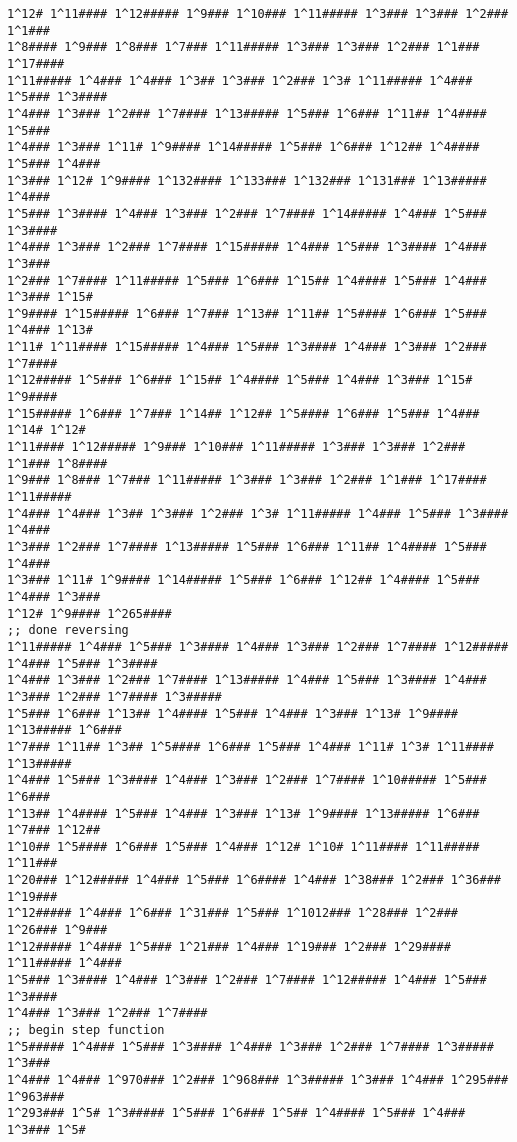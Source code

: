 \begin{@twocolumnfalse}
\begin{lstlisting}
1^12# 1^11#### 1^12##### 1^9### 1^10### 1^11##### 1^3### 1^3### 1^2### 1^1###
1^8#### 1^9### 1^8### 1^7### 1^11##### 1^3### 1^3### 1^2### 1^1### 1^17####
1^11##### 1^4### 1^4### 1^3## 1^3### 1^2### 1^3# 1^11##### 1^4### 1^5### 1^3####
1^4### 1^3### 1^2### 1^7#### 1^13##### 1^5### 1^6### 1^11## 1^4#### 1^5###
1^4### 1^3### 1^11# 1^9#### 1^14##### 1^5### 1^6### 1^12## 1^4#### 1^5### 1^4###
1^3### 1^12# 1^9#### 1^132#### 1^133### 1^132### 1^131### 1^13##### 1^4###
1^5### 1^3#### 1^4### 1^3### 1^2### 1^7#### 1^14##### 1^4### 1^5### 1^3####
1^4### 1^3### 1^2### 1^7#### 1^15##### 1^4### 1^5### 1^3#### 1^4### 1^3###
1^2### 1^7#### 1^11##### 1^5### 1^6### 1^15## 1^4#### 1^5### 1^4### 1^3### 1^15#
1^9#### 1^15##### 1^6### 1^7### 1^13## 1^11## 1^5#### 1^6### 1^5### 1^4### 1^13#
1^11# 1^11#### 1^15##### 1^4### 1^5### 1^3#### 1^4### 1^3### 1^2### 1^7####
1^12##### 1^5### 1^6### 1^15## 1^4#### 1^5### 1^4### 1^3### 1^15# 1^9####
1^15##### 1^6### 1^7### 1^14## 1^12## 1^5#### 1^6### 1^5### 1^4### 1^14# 1^12#
1^11#### 1^12##### 1^9### 1^10### 1^11##### 1^3### 1^3### 1^2### 1^1### 1^8####
1^9### 1^8### 1^7### 1^11##### 1^3### 1^3### 1^2### 1^1### 1^17#### 1^11#####
1^4### 1^4### 1^3## 1^3### 1^2### 1^3# 1^11##### 1^4### 1^5### 1^3#### 1^4###
1^3### 1^2### 1^7#### 1^13##### 1^5### 1^6### 1^11## 1^4#### 1^5### 1^4###
1^3### 1^11# 1^9#### 1^14##### 1^5### 1^6### 1^12## 1^4#### 1^5### 1^4### 1^3###
1^12# 1^9#### 1^265#### 
;; done reversing 
1^11##### 1^4### 1^5### 1^3#### 1^4### 1^3### 1^2### 1^7#### 1^12##### 1^4### 1^5### 1^3####
1^4### 1^3### 1^2### 1^7#### 1^13##### 1^4### 1^5### 1^3#### 1^4### 1^3### 1^2### 1^7#### 1^3#####
1^5### 1^6### 1^13## 1^4#### 1^5### 1^4### 1^3### 1^13# 1^9#### 1^13##### 1^6###
1^7### 1^11## 1^3## 1^5#### 1^6### 1^5### 1^4### 1^11# 1^3# 1^11#### 1^13#####
1^4### 1^5### 1^3#### 1^4### 1^3### 1^2### 1^7#### 1^10##### 1^5### 1^6###
1^13## 1^4#### 1^5### 1^4### 1^3### 1^13# 1^9#### 1^13##### 1^6### 1^7### 1^12##
1^10## 1^5#### 1^6### 1^5### 1^4### 1^12# 1^10# 1^11#### 1^11##### 1^11###
1^20### 1^12##### 1^4### 1^5### 1^6#### 1^4### 1^38### 1^2### 1^36### 1^19###
1^12##### 1^4### 1^6### 1^31### 1^5### 1^1012### 1^28### 1^2### 1^26### 1^9###
1^12##### 1^4### 1^5### 1^21### 1^4### 1^19### 1^2### 1^29#### 1^11##### 1^4###
1^5### 1^3#### 1^4### 1^3### 1^2### 1^7#### 1^12##### 1^4### 1^5### 1^3####
1^4### 1^3### 1^2### 1^7#### 
;; begin step function 
1^5##### 1^4### 1^5### 1^3#### 1^4### 1^3### 1^2### 1^7#### 1^3##### 1^3###
1^4### 1^4### 1^970### 1^2### 1^968### 1^3##### 1^3### 1^4### 1^295### 1^963###
1^293### 1^5# 1^3##### 1^5### 1^6### 1^5## 1^4#### 1^5### 1^4### 1^3### 1^5#

\end{lstlisting}
\end{@twocolumnfalse}
